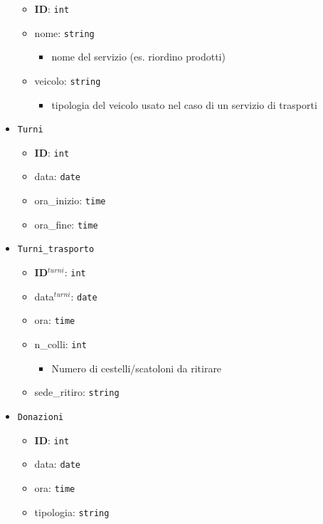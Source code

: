 \documentclass[]{article}
\providecommand{\tightlist}{%
  \setlength{\itemsep}{0pt}\setlength{\parskip}{0pt}}
\begin{document}
\begin{itemize}
  \begin{itemize}
  \tightlist
  \item
    \textbf{ID}: \texttt{int}
  \item
    nome: \texttt{string}

    \begin{itemize}
    \tightlist
    \item
      nome del servizio (es. riordino prodotti)
    \end{itemize}
  \item
    veicolo: \texttt{string}

    \begin{itemize}
    \tightlist
    \item
      tipologia del veicolo usato nel caso di un servizio di trasporti
    \end{itemize}
  \end{itemize}
\item
  \texttt{Turni}

  \begin{itemize}
  \tightlist
  \item
    \textbf{ID}: \texttt{int}
  \item
    data: \texttt{date}
  \item
    ora\_inizio: \texttt{time}
  \item
    ora\_fine: \texttt{time}
  \end{itemize}
\item
  \texttt{Turni\_trasporto}

  \begin{itemize}
  \tightlist
  \item
    \textbf{ID}\(^{turni}\): \texttt{int}
  \item
    data\(^{turni}\): \texttt{date}
  \item
    ora: \texttt{time}
  \item
    n\_colli: \texttt{int}

    \begin{itemize}
    \tightlist
    \item
      Numero di cestelli/scatoloni da ritirare
    \end{itemize}
  \item
    sede\_ritiro: \texttt{string}
  \end{itemize}
\item
  \texttt{Donazioni}

  \begin{itemize}
  \tightlist
  \item
    \textbf{ID}: \texttt{int}
  \item
    data: \texttt{date}
  \item
    ora: \texttt{time}
  \item
    tipologia: \texttt{string}


\end{itemize}
\end{itemize}
\end{document}
